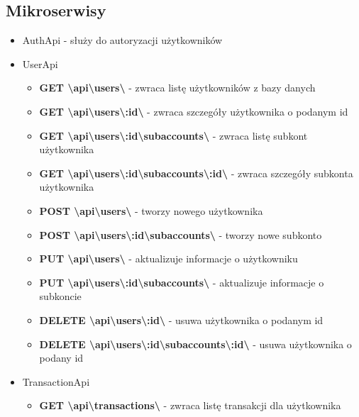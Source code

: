\documentclass{article}
\begin{document}
	\subsection{Mikroserwisy}
	\begin{itemize}
		\item AuthApi - służy do autoryzacji użytkowników
		\item UserApi
			\begin{itemize}
				\item \textbf{GET \textbackslash{api}\textbackslash{users}\textbackslash} - zwraca listę użytkowników z bazy danych
				\item \textbf{GET \textbackslash{api}\textbackslash{users}\textbackslash{:id}\textbackslash} - zwraca szczegóły użytkownika o podanym id
				\item \textbf{GET \textbackslash{api}\textbackslash{users}\textbackslash{:id}\textbackslash{subaccounts}\textbackslash} - zwraca listę subkont użytkownika
				\item \textbf{GET \textbackslash{api}\textbackslash{users}\textbackslash{:id}\textbackslash{subaccounts}\textbackslash{:id}\textbackslash} - zwraca szczegóły subkonta użytkownika
				\item \textbf{POST \textbackslash{api}\textbackslash{users}\textbackslash} - tworzy nowego użytkownika
				\item \textbf{POST \textbackslash{api}\textbackslash{users}\textbackslash{:id}\textbackslash{subaccounts}\textbackslash} - tworzy nowe subkonto
				\item \textbf{PUT \textbackslash{api}\textbackslash{users}\textbackslash} - aktualizuje informacje o użytkowniku
				\item \textbf{PUT \textbackslash{api}\textbackslash{users}\textbackslash{:id}\textbackslash{subaccounts}\textbackslash} - aktualizuje informacje o subkoncie
				\item \textbf{DELETE \textbackslash{api}\textbackslash{users}\textbackslash{:id}\textbackslash} - usuwa użytkownika o podanym id
				\item \textbf{DELETE \textbackslash{api}\textbackslash{users}\textbackslash{:id}\textbackslash{subaccounts}\textbackslash{:id}\textbackslash} - usuwa użytkownika o podany id
			\end{itemize}
		\item TransactionApi
			\begin{itemize}
				\item \textbf{GET \textbackslash{api}\textbackslash{transactions}\textbackslash} - zwraca listę transakcji dla użytkownika

\end{itemize}
\end{itemize}
\end{document}
